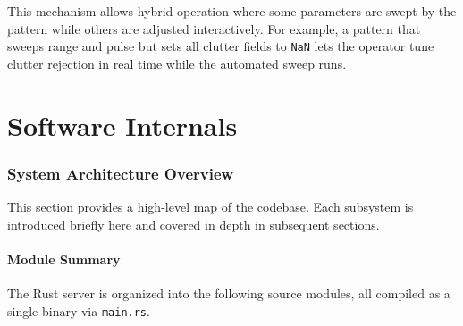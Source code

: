 \documentclass[11pt,letterpaper]{article}
\begin{document}
This mechanism allows hybrid operation where some parameters are swept by the pattern while others are adjusted interactively. For example, a pattern that sweeps range and pulse but sets all clutter fields to \texttt{NaN} lets the operator tune clutter rejection in real time while the automated sweep runs.


%
%

\newpage
\part{Software Internals}
\label{part:internals}


\section{System Architecture Overview}
\label{sec:architecture}

This section provides a high-level map of the codebase. Each subsystem is introduced briefly here and covered in depth in subsequent sections.

\subsection{Module Summary}
\label{subsec:module-summary}

The Rust server is organized into the following source modules, all compiled as a single binary via \texttt{main.rs}.
\end{document}
